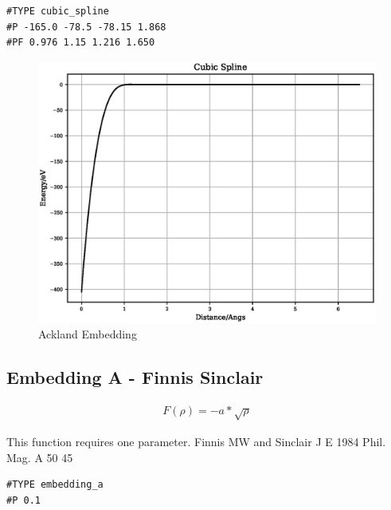 \documentclass[12pt,twoside]{manual}
\begin{document}
\begin{appendices}
\begin{lstlisting}[style=pseudocode,caption={Cubic Splines}]
#TYPE cubic_spline
#P -165.0 -78.5 -78.15 1.868
#PF 0.976 1.15 1.216 1.650
\end{lstlisting}

\FloatBarrier
\begin{figure}[h]
  \begin{center}
    \includegraphics[scale=0.5]{img/plots/cubic_spline.eps}
    \caption{Ackland Embedding}
    \label{graph:graph1}
  \end{center}
\end{figure}
\FloatBarrier







\subsection{Embedding A - Finnis Sinclair}

\begin{equation}
\begin{split}
F(\rho) = -a * \sqrt{\rho}
\end{split}
\label{eq:finnisSinclair}
\end{equation}

This function requires one parameter. 
Finnis MW and Sinclair J E 1984 Phil. Mag. A 50 45

\begin{lstlisting}[style=pseudocode,caption={Embedding A}]
#TYPE embedding_a
#P 0.1
\end{lstlisting}


\end{appendices}
\end{document}
